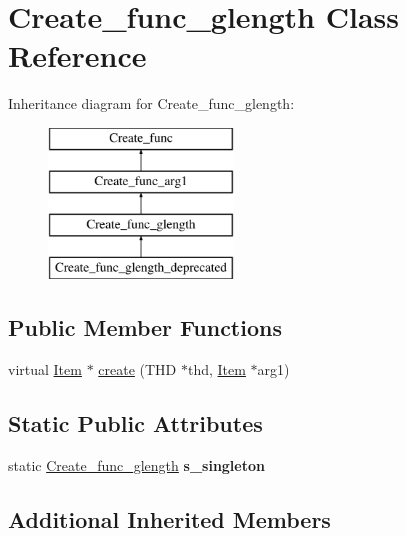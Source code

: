 \hypertarget{classCreate__func__glength}{}\section{Create\+\_\+func\+\_\+glength Class Reference}
\label{classCreate__func__glength}
Inheritance diagram for Create\+\_\+func\+\_\+glength\+:\begin{figure}[H]
\begin{center}
\leavevmode
\includegraphics[height=4.000000cm]{classCreate__func__glength}
\end{center}
\end{figure}
\subsection*{Public Member Functions}
\begin{DoxyCompactItemize}
\item 
virtual \mbox{\hyperlink{classItem}{Item}} $\ast$ \mbox{\hyperlink{classCreate__func__glength_a419eeeb9fb55b66d9e21c4e7a9c7fc0d}{create}} (T\+HD $\ast$thd, \mbox{\hyperlink{classItem}{Item}} $\ast$arg1)
\end{DoxyCompactItemize}
\subsection*{Static Public Attributes}
\begin{DoxyCompactItemize}
\item 
\mbox{\label{classCreate__func__glength_a917598a4f95a49c4520c7a9dd81295e8}} 
static \mbox{\hyperlink{classCreate__func__glength}{Create\+\_\+func\+\_\+glength}} {\bfseries s\+\_\+singleton}
\end{DoxyCompactItemize}
\subsection*{Additional Inherited Members}



